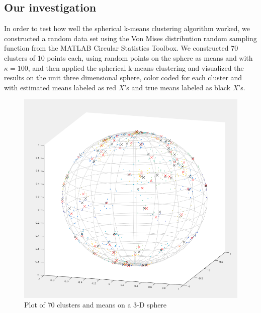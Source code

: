 \subsection*{Our investigation}

In order to test how well the spherical k-means clustering algorithm
worked, we constructed a random data set using the Von Mises distribution
random sampling function from the MATLAB Circular Statistics Toolbox\cite{circstats}.
We constructed 70 clusters of 10 points each, using random points
on the sphere as means and with $\kappa=100$, and then applied the
spherical k-means clustering and visualized the results on the unit
three dimensional sphere, color coded for each cluster and with estimated
means labeled as red $X$'s and true means labeled as black $X$'s.

\begin{figure}


\caption{Plot of 70 clusters and means on a 3-D sphere}


\includegraphics[width=1\textwidth]{img/sphere_points_70_clusters}
\end{figure}


